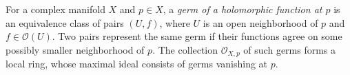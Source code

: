 
For a complex manifold $X$ and $p\in X$, a \emph{germ of a holomorphic function at $p$} is an equivalence class of pairs $(U,f)$, where $U$ is an open neighborhood of $p$ and $f\in\mathcal O(U)$. Two pairs represent the same germ if their functions agree on some possibly smaller neighborhood of $p$. The collection $\mathcal O_{X,p}$ of such germs forms a local ring, whose maximal ideal consists of germs vanishing at $p$.
